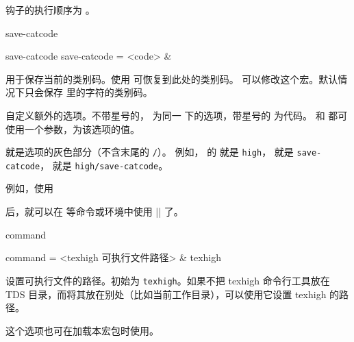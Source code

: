\documentclass[class=article,openany]{cusdoc}[2025/09/29]
\begin{document}
钩子的执行顺序为       。

\begin{keyval}[path=high]{save-catcode}
  \begin{syntax}
    save-catcode
    save-catcode = <code> &~
  \end{syntax}
用于保存当前的类别码。使用  可恢复到此处的类别码。 可以修改这个宏。默认情况下只会保存  里的字符的类别码。
\end{keyval}

\begin{function}{\texhighdefstyle}
  \begin{syntax}
    \V\texhighdefstyle   {} 
    \V\texhighdefstyle   {}  
    \V\texhighdefstyle *  
    \V\texhighdefstyle *   
  \end{syntax}
自定义额外的选项。不带星号的， 为同一  下的选项，带星号的  为代码。 和  都可使用一个参数，为该选项的值。

 就是选项的灰色部分（不含末尾的 \texttt{/}）。
例如， 的  就是 \texttt{high}，
 就是 \texttt{save-catcode}， 就是 \texttt{high/save-catcode}。
\end{function}

例如，使用
\begin{thverbatim}
\end{thverbatim}
后，就可以在  等命令或环境中使用 \texhighverb|| 了。

\begin{keyval}[path=high,added=2025/09/29]{command}
  \begin{syntax}
    command = <{texhigh 可执行文件路径}> & texhigh
  \end{syntax}
设置可执行文件的路径。初始为 \texttt{texhigh}。如果不把 texhigh 命令行工具放在 TDS 目录，而将其放在别处（比如当前工作目录），可以使用它设置 texhigh 的路径。

这个选项也可在加载本宏包时使用。
\end{keyval}
\end{document}
